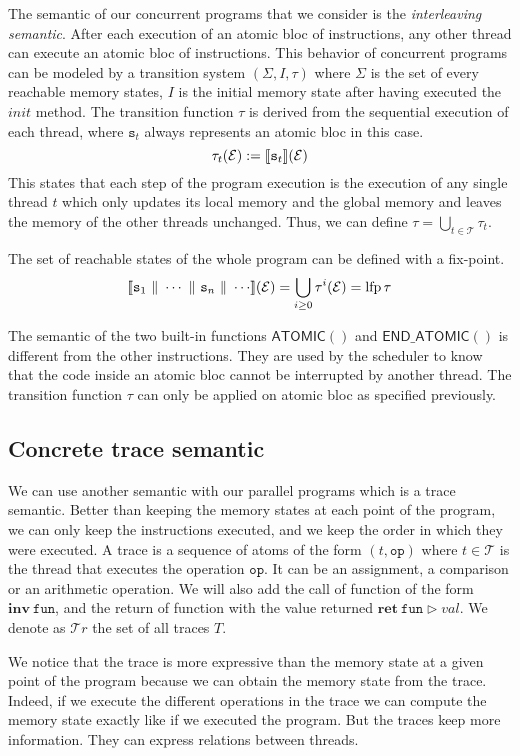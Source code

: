\documentclass[runningheads]{llncs}
\newcommand\srule{\mathtt{s}}
\newcommand{\atomicbegin}{\mathsf{ATOMIC()}}
\newcommand{\atomicend}{\mathsf{END\_ATOMIC()}}
\newcommand{\inv}[1]{\mathbf{inv}\ \mathtt{#1}}
\newcommand{\ret}[2]{\mathbf{ret}\ \mathtt{#1} \vartriangleright #2}
\newcommand{\Thread}{\mathcal T}
\newcommand{\Traces}{\mathcal T\!r}
\newcommand{\parallelcomposition}{\Vert}
\DeclareMathOperator{\lfp}{lfp}
\begin{document}
The semantic of our concurrent programs that we consider is the \emph{interleaving semantic}. After each execution of an atomic bloc of instructions, any other thread can execute an atomic bloc of instructions. This behavior of concurrent programs can be modeled by a transition system $(\Sigma, I, \tau)$ where $\Sigma$ is the set of every reachable memory states, $I$ is the initial memory state after having executed the $init$ method. The transition function $\tau$ is derived from the sequential execution of each thread, where $\srule_t$ always represents an atomic bloc in this case. 
\[\tau_t (\mathcal E) := \exec{\srule_t}(\mathcal E)\]
This states that each step of the program execution is the execution of any single thread  $t$ which only updates its local memory and the global memory and leaves the memory of the other threads unchanged. Thus, we can define $\tau = \bigcup_{t\in\Thread} \tau_t$.

The set of reachable states of the whole program can be defined with a fix-point. 
\[\exec{\srule_1 \ \parallelcomposition \ \cdots \ \parallelcomposition \ \srule_n \ \parallelcomposition \ \cdots}(\mathcal E) = \bigcup_{i \geq 0} \tau^i(\mathcal E) = \lfp \tau\]


The semantic of the two built-in functions $\atomicbegin$ and $\atomicend$ is different from the other instructions. They are used by the scheduler to know that the code inside an atomic bloc cannot be interrupted by another thread. The transition function $\tau$ can only be applied on atomic bloc as specified previously. 


	\subsection{Concrete trace semantic}
	
We can use another semantic with our parallel programs which is a trace semantic. Better than keeping the memory states at each point of the program, we can only keep the instructions executed, and we keep the order in which they were executed. A trace is a sequence of atoms of the form $(t, \mathtt{op})$ where $t \in \Thread$ is the thread that executes the operation $\mathtt{op}$. It can be an assignment, a comparison or an arithmetic operation. We will also add the call of function of the form $\inv{fun}$, and the return of function with the value returned $\ret{fun}{val}$.
We denote as $\Traces$ the set of all traces $T$. 

We notice that the trace is more expressive than the memory state at a given point of the program because we can obtain the memory state from the trace. Indeed, if we execute the different operations in the trace we can compute the memory state exactly like if we executed the program. But the traces keep more information. They can express relations between threads.
\end{document}
